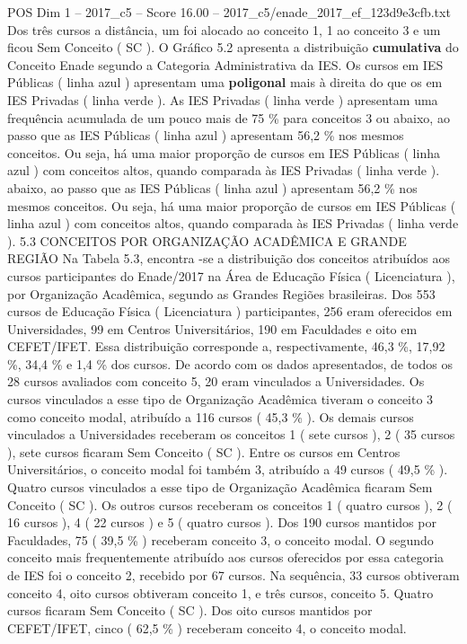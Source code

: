 \begin{textsample}{POS Dim 1 – 2017\_c5 – Score 16.00 – 2017\_c5/enade\_2017\_ef\_123d9e3cfb.txt}
Dos três cursos a distância, um foi alocado ao conceito 1, 1 ao conceito 3 e um ficou Sem Conceito ( SC ).
O Gráfico 5.2 apresenta a distribuição \textbf{cumulativa} do Conceito Enade segundo a Categoria Administrativa da IES.
Os cursos em IES Públicas ( linha azul ) apresentam uma \textbf{poligonal} mais à direita do que os em IES Privadas ( linha verde ).
As IES Privadas ( linha verde ) apresentam uma frequência acumulada de um pouco mais de 75 \% para conceitos 3 ou abaixo, ao passo que as IES Públicas ( linha azul ) apresentam 56,2 \% nos mesmos conceitos.
Ou seja, há uma maior proporção de cursos em IES Públicas ( linha azul ) com conceitos altos, quando comparada às IES Privadas ( linha verde ). abaixo, ao passo que as IES Públicas ( linha azul ) apresentam 56,2 \% nos mesmos conceitos.
Ou seja, há uma maior proporção de cursos em IES Públicas ( linha azul ) com conceitos altos, quando comparada às IES Privadas ( linha verde ). 5.3 CONCEITOS POR ORGANIZAÇÃO ACADÊMICA E GRANDE REGIÃO Na Tabela 5.3, encontra -se a distribuição dos conceitos atribuídos aos cursos participantes do Enade/2017 na Área de Educação Física ( Licenciatura ), por Organização Acadêmica, segundo as Grandes Regiões brasileiras.
Dos 553 cursos de Educação Física ( Licenciatura ) participantes, 256 eram oferecidos em Universidades, 99 em Centros Universitários, 190 em Faculdades e oito em CEFET/IFET.
Essa distribuição corresponde a, respectivamente, 46,3 \%, 17,92 \%, 34,4 \% e 1,4 \% dos cursos.
De acordo com os dados apresentados, de todos os 28 cursos avaliados com conceito 5, 20 eram vinculados a Universidades.
Os cursos vinculados a esse tipo de Organização Acadêmica tiveram o conceito 3 como conceito modal, atribuído a 116 cursos ( 45,3 \% ).
Os demais cursos vinculados a Universidades receberam os conceitos 1 ( sete cursos ), 2 ( 35 cursos ), sete cursos ficaram Sem Conceito ( SC ).
Entre os cursos em Centros Universitários, o conceito modal foi também 3, atribuído a 49 cursos ( 49,5 \% ).
Quatro cursos vinculados a esse tipo de Organização Acadêmica ficaram Sem Conceito ( SC ).
Os outros cursos receberam os conceitos 1 ( quatro cursos ), 2 ( 16 cursos ), 4 ( 22 cursos ) e 5 ( quatro cursos ).
Dos 190 cursos mantidos por Faculdades, 75 ( 39,5 \% ) receberam conceito 3, o conceito modal.
O segundo conceito mais frequentemente atribuído aos cursos oferecidos por essa categoria de IES foi o conceito 2, recebido por 67 cursos.
Na sequência, 33 cursos obtiveram conceito 4, oito cursos obtiveram conceito 1, e três cursos, conceito 5.
Quatro cursos ficaram Sem Conceito ( SC ).
Dos oito cursos mantidos por CEFET/IFET, cinco ( 62,5 \% ) receberam conceito 4, o conceito modal.

\end{textsample}
